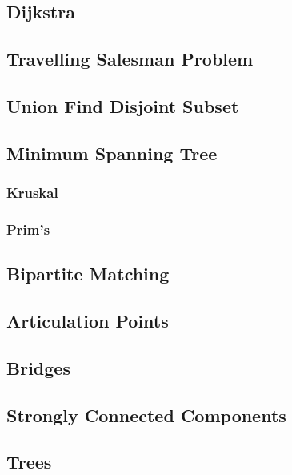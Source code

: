 \documentclass{article}
\begin{document}
\subsection{Dijkstra}

\subsection{Travelling Salesman Problem}

\subsection{Union Find Disjoint Subset}


\subsection{Minimum Spanning Tree}
\subsubsection{Kruskal}

\subsubsection{Prim's}


\subsection{Bipartite Matching}

\subsection{Articulation Points}

\subsection{Bridges}

\subsection{Strongly Connected Components}


\subsection{Trees}
\end{document}
